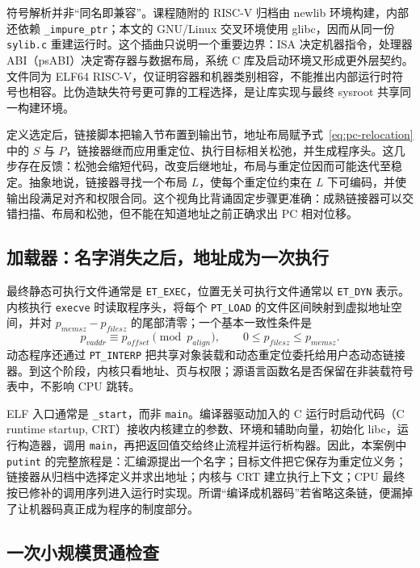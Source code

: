 符号解析并非“同名即兼容”。课程随附的 RISC-V 归档由 newlib 环境构建，内部还依赖 \texttt{\_impure\_ptr}；本文的 GNU/Linux 交叉环境使用 glibc，因而从同一份 \texttt{sylib.c} 重建运行时。这个插曲只说明一个重要边界：ISA 决定机器指令，处理器 ABI（psABI）决定寄存器与数据布局，系统 C 库及启动环境又形成更外层契约。文件同为 ELF64 RISC-V，仅证明容器和机器类别相容，不能推出内部运行时符号也相容。比伪造缺失符号更可靠的工程选择，是让库实现与最终 sysroot 共享同一构建环境。

定义选定后，链接脚本把输入节布置到输出节，地址布局赋予式~\eqref{eq:pc-relocation} 中的 \(S\) 与 \(P\)，链接器继而应用重定位、执行目标相关松弛，并生成程序头\cite{bin-gnu-ld-scripts}。这几步存在反馈：松弛会缩短代码，改变后继地址，布局与重定位因而可能迭代至稳定。抽象地说，链接器寻找一个布局 \(L\)，使每个重定位约束在 \(L\) 下可编码，并使输出段满足对齐和权限合同。这个视角比背诵固定步骤更准确：成熟链接器可以交错扫描、布局和松弛，但不能在知道地址之前正确求出 PC 相对位移。

\subsection{加载器：名字消失之后，地址成为一次执行}

最终静态可执行文件通常是 \texttt{ET\_EXEC}，位置无关可执行文件通常以 \texttt{ET\_DYN} 表示。内核执行 \texttt{execve} 时读取程序头，将每个 \texttt{PT\_LOAD} 的文件区间映射到虚拟地址空间，并对 \(p_{memsz}-p_{filesz}\) 的尾部清零；一个基本一致性条件是
\[
  p_{vaddr}\equiv p_{offset}\pmod {p_{align}},
  \qquad 0\le p_{filesz}\le p_{memsz}.
\]
动态程序还通过 \texttt{PT\_INTERP} 把共享对象装载和动态重定位委托给用户态动态链接器\cite{bin-sysv-gabi-dynamic}。到这个阶段，内核只看地址、页与权限；源语言函数名是否保留在非装载符号表中，不影响 CPU 跳转。

ELF 入口通常是 \texttt{\_start}，而非 \texttt{main}。编译器驱动加入的 C 运行时启动代码（C runtime startup, CRT）接收内核建立的参数、环境和辅助向量，初始化 libc，运行构造器，调用 \texttt{main}，再把返回值交给终止流程并运行析构器\cite{bin-linux-execve}。因此，本案例中 \texttt{putint} 的完整旅程是：汇编源提出一个名字；目标文件把它保存为重定位义务；链接器从归档中选择定义并求出地址；内核与 CRT 建立执行上下文；CPU 最终按已修补的调用序列进入运行时实现。所谓“编译成机器码”若省略这条链，便漏掉了让机器码真正成为程序的制度部分。

\subsection{一次小规模贯通检查}

